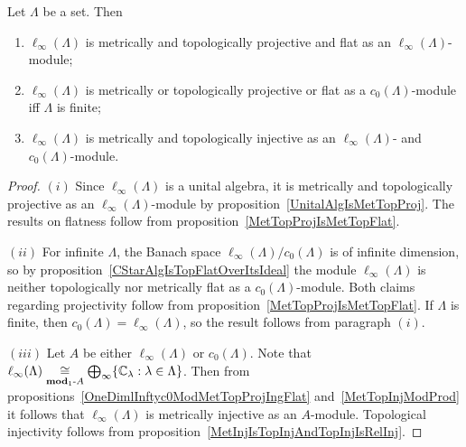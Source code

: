 \begin{proposition}\label{c0AndlInftyModlIfty} Let $\Lambda$ be a set. Then

\begin{enumerate}[label = (\roman*)]
    \item $\ell_\infty(\Lambda)$ is metrically and topologically projective 
    and flat as an $\ell_\infty(\Lambda)$-module;

    \item $\ell_\infty(\Lambda)$ is metrically or topologically projective 
    or flat as a $c_0(\Lambda)$-module iff $\Lambda$ is finite;

    \item $\ell_\infty(\Lambda)$ is metrically and topologically injective as
    an $\ell_\infty(\Lambda)$- and $c_0(\Lambda)$-module.
\end{enumerate}
\end{proposition}
\begin{proof} $(i)$ Since $\ell_\infty(\Lambda)$ is a unital algebra, it is
metrically and topologically projective as an $\ell_\infty(\Lambda)$-module by
proposition~\ref{UnitalAlgIsMetTopProj}. The results on flatness follow from
proposition~\ref{MetTopProjIsMetTopFlat}.

$(ii)$ For infinite $\Lambda$, the Banach space
$\ell_\infty(\Lambda)/c_0(\Lambda)$ is of infinite dimension, so by
proposition~\ref{CStarAlgIsTopFlatOverItsIdeal} the module
$\ell_\infty(\Lambda)$ is neither topologically nor metrically flat as
a $c_0(\Lambda)$-module. Both claims regarding projectivity follow from
proposition~\ref{MetTopProjIsMetTopFlat}. If $\Lambda$ is finite, then
$c_0(\Lambda)=\ell_\infty(\Lambda)$, so the result follows from paragraph $(i)$.

$(iii)$ Let $A$ be either $\ell_\infty(\Lambda)$ or $c_0(\Lambda)$. Note that
$\ell_\infty(\Lambda)
\mathrel{\mathop{\cong}\limits_{\mathbf{mod}_1\text{-}A}}
\bigoplus_\infty \{\mathbb{C}_\lambda:\lambda\in\Lambda \}$. Then from
propositions~\ref{OneDimlInftyc0ModMetTopProjIngFlat} and~\ref{MetTopInjModProd}
it follows that $\ell_\infty(\Lambda)$ is metrically injective as an $A$-module.
Topological injectivity follows from
proposition~\ref{MetInjIsTopInjAndTopInjIsRelInj}.
\end{proof}

